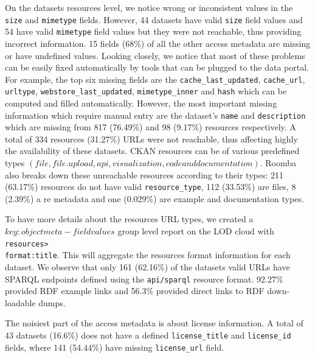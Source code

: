 \documentclass[runningheads,a4paper]{llncs}
\begin{document}
On the datasets resources level, we notice wrong or inconsistent values in the \texttt{size} and \texttt{mimetype} fields. However, 44 datasets have valid \texttt{size} field values and 54 have valid \texttt{mimetype} field values but they were not reachable, thus providing incorrect information. 15 fields (68\%) of all the other access metadata are missing or have undefined values. Looking closely, we notice that most of these problems can be easily fixed automatically by tools that can be plugged to the data portal. For example, the top six missing fields are the \texttt{cache\_last\_updated}, \texttt{cache\_url}, \texttt{url\-type}, \texttt{webstore\_last\_updated}, \texttt{mimetype\-\_inner} and \texttt{hash} which can be computed and filled automatically. However, the most important missing information which require manual entry are the dataset's \texttt{name} and \texttt{description} which are missing from 817 (76.49\%) and 98 (9.17\%) resources respectively. A total of 334 resources (31.27\%) URLs were not reachable, thus affecting highly the availability of these datasets. CKAN resources can be of various predefined types $(file, file.upload, api, visualization, code and documentation)$. Roomba also breaks down these unreachable resources according to their types: 211 (63.17\%) resources do not have valid \texttt{resource\_type}, 112 (33.53\%) are files, 8 (2.39\%) a re metadata and one (0.029\%) are example and documentation types.

To have more details about the resources URL types, we created a $key:object meta-field values$ group level report on the LOD cloud with \texttt{resources>\\format:title}. This will aggregate the resources format information for each dataset. We observe that only 161 (62.16\%) of the datasets valid URLs have SPARQL endpoints defined using the \texttt{api/sparql} resource format. 92.27\% provided RDF example links and 56.3\% provided direct links to RDF down-loadable dumps.

The noisiest part of the access metadata is about license information. A total of 43 datasets (16.6\%) does not have a defined \texttt{license\_title} and \texttt{license\_id} fields, where 141 (54.44\%) have missing \texttt{license\_url} field.
\end{document}
